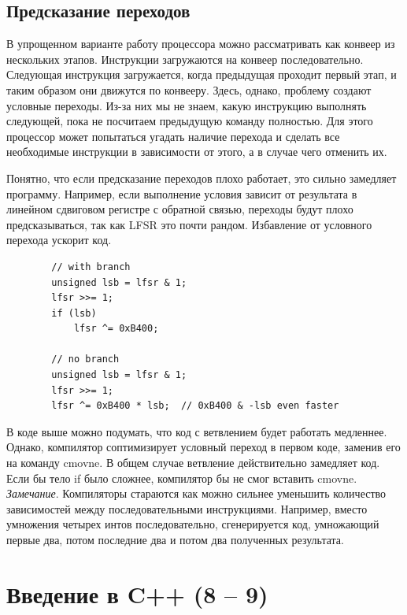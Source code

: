\documentclass[12pt, a4paper]{article}
\begin{document}
	\subsection{Предсказание переходов}
	В упрощенном варианте работу процессора можно рассматривать как конвеер из нескольких этапов. Инструкции загружаются на конвеер последовательно. Следующая инструкция загружается, когда предыдущая проходит первый этап, и таким образом они движутся по конвееру. Здесь, однако, проблему создают условные переходы. Из-за них мы не знаем, какую инструкцию выполнять следующей, пока не посчитаем предыдущую команду полностью. Для этого процессор может попытаться угадать наличие перехода и сделать все необходимые инструкции в зависимости от этого, а в случае чего отменить их.
	\par Понятно, что если предсказание переходов плохо работает, это сильно замедляет программу. Например, если выполнение условия зависит от результата в линейном сдвиговом регистре с обратной связью, переходы будут плохо предсказываться, так как LFSR это почти рандом. Избавление от условного перехода ускорит код.
	\begin{verbatim}
		// with branch
		unsigned lsb = lfsr & 1;
		lfsr >>= 1;
		if (lsb)
			lfsr ^= 0xB400;
		
		// no branch
		unsigned lsb = lfsr & 1;
		lfsr >>= 1;
		lfsr ^= 0xB400 * lsb;  // 0xB400 & -lsb even faster
	\end{verbatim}
	В коде выше можно подумать, что код с ветвлением будет работать медленнее. Однако, компилятор соптимизирует условный переход в первом коде, заменив его на команду cmovne. В общем случае ветвление действительно замедляет код. Если бы тело if было сложнее, компилятор бы не смог вставить cmovne.
	\\\textit{Замечание}. Компиляторы стараются как можно сильнее уменьшить количество зависимостей между последовательными инструкциями. Например, вместо умножения четырех интов последовательно, сгенерируется код, умножающий первые два, потом последние два и потом два полученных результата.
	\section{Введение в C++ (8 -- 9)}
\end{document}
